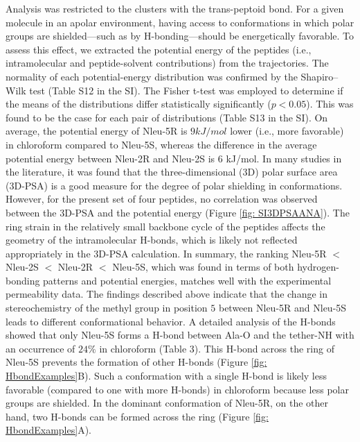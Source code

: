Analysis was restricted to the clusters with the trans-peptoid bond.
For a given molecule in an apolar environment, having access to conformations in which polar groups are shielded—such as by H-bonding—should be energetically favorable. 
To assess this effect, we extracted the potential energy of the peptides (i.e., intramolecular and peptide-solvent contributions) from the trajectories. 
The normality of each potential-energy distribution was confirmed by the Shapiro–Wilk test \cite{Shapiro1965} (Table S12 in the SI). 
The Fisher t-test \cite{Kotz1998} was employed to determine if the means of the distributions differ statistically significantly ($p < 0.05$). 
This was found to be the case for each pair of distributions (Table S13 in the SI). 
On average, the potential energy of Nleu-5R is $9 kJ/mol$ lower (i.e., more favorable) in chloroform compared to Nleu-5S, whereas the difference in the average potential energy between Nleu-2R and Nleu-2S is 6 kJ/mol. In many studies in the literature, it was found that the three-dimensional (3D) polar surface area (3D-PSA) is a good measure for the degree of polar shielding in conformations. \cite{Roux2020, Sebastiano2018, Vorherr2018, Peraro2018} 
However, for the present set of four peptides, no correlation was observed between the 3D-PSA and the potential energy (Figure \ref{fig: SI3DPSAANA}). 
The ring strain in the relatively small backbone cycle of the peptides affects the geometry of the intramolecular H-bonds, which is likely not reflected appropriately in the 3D-PSA calculation. 
In summary, the ranking Nleu-5R $<$ Nleu-2S $<$ Nleu-2R $<$ Nleu-5S, which was found in terms of both hydrogen-bonding patterns and potential energies, matches well with the experimental permeability data.
The findings described above indicate that the change in stereochemistry of the methyl group in position $5$ between Nleu-5R and Nleu-5S leads to different conformational behavior. 
A detailed analysis of the H-bonds showed that only Nleu-5S forms a H-bond between Ala-O and the tether-NH with an occurrence of $24\%$ in chloroform (Table 3). 
This H-bond across the ring of Nleu-5S prevents the formation of other H-bonds (Figure \ref{fig: HbondExamples}B).
Such a conformation with a single H-bond is likely less favorable (compared to one with more H-bonds) in chloroform because less polar groups are shielded. In the dominant conformation of Nleu-5R, on the other hand, two H-bonds can be formed across the ring (Figure \ref{fig: HbondExamples}A).
